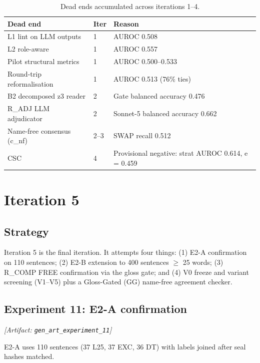 \documentclass[11pt,letterpaper]{article}
\begin{document}
\begin{table}[!htbp]
\centering
\caption{Dead ends accumulated across iterations 1--4.}
\label{tab:dead_ends_iter4}
\begin{tabular}{llp{6cm}}
\toprule
Dead end & Iter & Reason \\
\midrule
L1 lint on LLM outputs & 1 & AUROC 0.508 \\
L2 role-aware & 1 & AUROC 0.557 \\
Pilot structural metrics & 1 & AUROC 0.500--0.533 \\
Round-trip reformalisation & 1 & AUROC 0.513 (76\% ties) \\
B2 decomposed z3 reader & 2 & Gate balanced accuracy 0.476 \\
R\_ADJ LLM adjudicator & 2 & Sonnet-5 balanced accuracy 0.662 \\
Name-free consensus (c\_nf) & 2--3 & SWAP recall 0.512 \\
CSC & 4 & Provisional negative: strat AUROC 0.614, e = 0.459 \\
\bottomrule
\end{tabular}
\end{table}

\section{Iteration 5}

\subsection{Strategy}

Iteration 5 is the final iteration. It attempts four things: (1) E2-A confirmation on 110 sentences; (2) E2-B extension to 400 sentences $\geq$ 25 words; (3) R\_COMP FREE confirmation via the gloss gate; and (4) V0 freeze and variant screening (V1--V5) plus a Gloss-Gated (GG) name-free agreement checker.

\subsection{Experiment 11: E2-A confirmation}
\label{sec:exp11}
\noindent\textit{[Artifact: \texttt{gen\_art\_experiment\_11}]}

E2-A uses 110 sentences (37 L25, 37 EXC, 36 DT) with labels joined after seal hashes matched.
\end{document}

